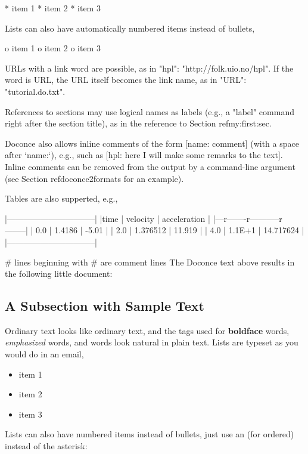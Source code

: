 \documentclass[%
oneside,                 %
final,                   %
10pt]{article}
\begin{document}
  * item 1
  * item 2
  * item 3

Lists can also have automatically numbered items instead of bullets,

  o item 1
  o item 2
  o item 3

URLs with a link word are possible, as in "hpl": "http://folk.uio.no/hpl".
If the word is URL, the URL itself becomes the link name,
as in "URL": "tutorial.do.txt".

References to sections may use logical names as labels (e.g., a
"label" command right after the section title), as in the reference to
Section ref{my:first:sec}.

Doconce also allows inline comments of the form [name: comment] (with
a space after `name:`), e.g., such as [hpl: here I will make some
remarks to the text]. Inline comments can be removed from the output
by a command-line argument (see Section ref{doconce2formats} for an
example).

Tables are also supperted, e.g.,

  |--------------------------------|
  |time  | velocity | acceleration |
  |---r-------r-----------r--------|
  | 0.0  | 1.4186   | -5.01        |
  | 2.0  | 1.376512 | 11.919       |
  | 4.0  | 1.1E+1   | 14.717624    |
  |--------------------------------|

# lines beginning with # are comment lines
\eccq
The Doconce text above results in the following little document:

\subsection{A Subsection with Sample Text}
\label{my:first:sec}

Ordinary text looks like ordinary text, and the tags used for
\textbf{boldface} words, \emph{emphasized} words, and  words look
natural in plain text.  Lists are typeset as you would do in an email,

\begin{itemize}
  \item item 1

  \item item 2

  \item item 3
\end{itemize}

\noindent
Lists can also have numbered items instead of bullets, just use an 
(for ordered) instead of the asterisk:
\end{document}
